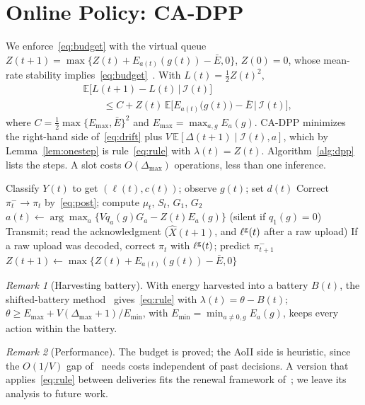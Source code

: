 \documentclass[conference]{IEEEtran}
\theoremstyle{remark}
\newtheorem{remark}{Remark}
\newcommand{\E}{\mathbb{E}}
\newcommand{\I}{\mathcal{I}}
\newcommand{\lab}{\ell}
\begin{document}
\section{Online Policy: CA-DPP}\label{sec:lyap}
We enforce~\eqref{eq:budget} with the virtual queue $Z(t+1)=\max\big\{Z(t)+E_{a(t)}(g(t))-\bar E,0\big\}$, $Z(0)=0$, whose mean-rate stability implies~\eqref{eq:budget}~\cite{neely2010book}. With $L(t)=\tfrac12Z(t)^2$,
\begin{equation}\label{eq:drift}
\begin{split}
&\E\big[L(t+1)-L(t)\,|\,\I(t)\big]\\
&\qquad\le C+Z(t)\,\E\Big[E_{a(t)}\big(g(t)\big)-\bar E\,\Big|\,\I(t)\Big],
\end{split}
\end{equation}
where $C=\tfrac12\max\{E_{\max},\bar E\}^2$ and $E_{\max}=\max_{a,g}E_a(g)$. CA-DPP minimizes the right-hand side of~\eqref{eq:drift} plus $V\,\E[\Delta(t+1)\mid\I(t),a]$, which by Lemma~\ref{lem:onestep} is rule~\eqref{eq:rule} with $\lambda(t)=Z(t)$. Algorithm~\ref{alg:dpp} lists the steps. A slot costs $O(\Delta_{\max})$ operations, less than one inference.

\begin{algorithm}[t]
\caption{CA-DPP, executed by the UAV in slot $t$}\label{alg:dpp}
\begin{algorithmic}[1]
\State Classify $Y(t)$ to get $(\lab(t),c(t))$; observe $g(t)$; set $d(t)$
\State Correct $\pi^-_t\to\pi_t$ by~\eqref{eq:post}; compute $\mu_t$, $S_t$, $G_1$, $G_2$
\State $a(t)\gets\arg\max_a\{Vq_a(g)G_a-Z(t)E_a(g)\}$ (silent if $q_1(g)=0$)
\State Transmit; read the acknowledgment ($\hat X(t+1)$, and $\lab^{\rm g}(t)$ after a raw upload)
\State If a raw upload was decoded, correct $\pi_t$ with $\lab^{\rm g}(t)$; predict $\pi^-_{t+1}$
\State $Z(t+1)\gets\max\big\{Z(t)+E_{a(t)}(g(t))-\bar E,0\big\}$
\end{algorithmic}
\end{algorithm}

\begin{remark}[Harvesting battery]
With energy harvested into a battery $B(t)$, the shifted-battery method~\cite{huang2013eh} gives~\eqref{eq:rule} with $\lambda(t)=\theta-B(t)$; $\theta\ge E_{\max}+V(\Delta_{\max}+1)/E_{\min}$, with $E_{\min}=\min_{a\neq0,g}E_a(g)$, keeps every action within the battery.
\end{remark}

\begin{remark}[Performance]
The budget is proved; the AoII side is heuristic, since the $O(1/V)$ gap of~\cite{neely2010book} needs costs independent of past decisions. A version that applies~\eqref{eq:rule} between deliveries fits the renewal framework of~\cite{neely2013renewal}; we leave its analysis to future work.
\end{remark}
\end{document}
